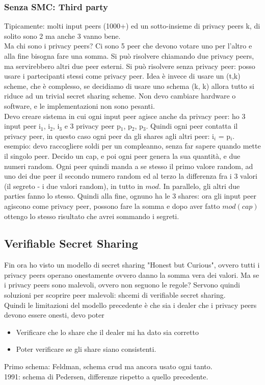 \documentclass[16px]{article}
\begin{document}
\subsubsection{Senza SMC: Third party}
Tipicamente: molti input peers (1000+) ed un sotto-insieme di privacy peers k, di solito sono 2 ma anche 3 vanno bene.\\ Ma chi sono i privacy peers? Ci sono 5 peer che devono votare uno per l'altro e alla fine bisogna fare una somma. Si può risolvere chiamando due privacy peers, ma servirebbero altri due peer esterni. Si può risolvere senza privacy peer: posso usare i partecipanti stessi come privacy peer. Idea è invece di usare un (t,k) scheme, che è complesso, se decidiamo di usare uno schema (k, k) allora tutto si riduce ad un trivial secret sharing scheme. Non devo cambiare hardware o software, e le implementazioni non sono pesanti.\\Devo creare sistema in cui ogni input peer agisce anche da privacy peer: ho 3 input peer i$_1$, i$_2$, i$_3$ e 3 privacy peer p$_1$, p$_2$, p$_3$. Quindi ogni peer contatta il privacy peer, in questo caso ogni peer da gli shares agli altri peer: i$_i$ = p$_i$.\\ esempio: devo raccogliere soldi per un compleanno, senza far sapere quando mette il singolo peer. Decido un cap, e poi ogni peer genera la sua quantità, e due numeri random. Ogni peer quindi manda a se stesso il primo valore random, ad uno dei due peer il secondo numero random ed al terzo la differenza fra i 3 valori (il segreto - i due valori random), in tutto in $mod$. In parallelo, gli altri due parties fanno lo stesso. Quindi alla fine, ognuno ha le 3 shares: ora gli input peer agiscono come privacy peer, possono fare la somma e dopo aver fatto $mod(cap)$ ottengo lo stesso risultato che avrei sommando i segreti.
\subsection{Verifiable Secret Sharing}
Fin ora ho visto un modello di secret sharing "Honest but Curious", ovvero tutti i privacy peers operano onestamente ovvero danno la somma vera dei valori. Ma se i privacy peers sono malevoli, ovvero non seguono le regole? Servono quindi soluzioni per scoprire peer malevoli: shcemi di verifiable secret sharing.\\ Quindi le limitazioni del modello precedente è che sia i dealer che i privacy peers devono essere onesti, devo poter
\begin{itemize}
\item Verificare che lo share che il dealer mi ha dato sia corretto
\item Poter verificare se gli share siano consistenti.
\end{itemize}
Primo schema: Feldman, schema crud ma ancora usato ogni tanto.\\ 1991: schema di Pedersen, differenze rispetto a quello precedente.
\end{document}
